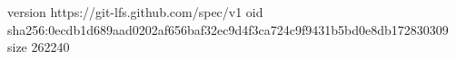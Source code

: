 version https://git-lfs.github.com/spec/v1
oid sha256:0ecdb1d689aad0202af656baf32ec9d4f3ca724c9f9431b5bd0e8db172830309
size 262240
